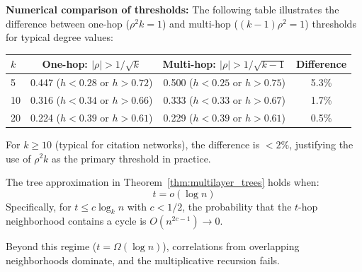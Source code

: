 \begin{remark}
\textbf{Numerical comparison of thresholds:} The following table illustrates the difference between one-hop ($\rho^2 k = 1$) and multi-hop ($(k-1)\rho^2 = 1$) thresholds for typical degree values:
\begin{center}
\begin{tabular}{lccc}
\toprule
$k$ & One-hop: $|\rho| > 1/\sqrt{k}$ & Multi-hop: $|\rho| > 1/\sqrt{k-1}$ & Difference \\
\midrule
5 & 0.447 ($h < 0.28$ or $h > 0.72$) & 0.500 ($h < 0.25$ or $h > 0.75$) & 5.3\% \\
10 & 0.316 ($h < 0.34$ or $h > 0.66$) & 0.333 ($h < 0.33$ or $h > 0.67$) & 1.7\% \\
20 & 0.224 ($h < 0.39$ or $h > 0.61$) & 0.229 ($h < 0.39$ or $h > 0.61$) & 0.5\% \\
\bottomrule
\end{tabular}
\end{center}
For $k \geq 10$ (typical for citation networks), the difference is $< 2\%$, justifying the use of $\rho^2 k$ as the primary threshold in practice.
\end{remark}

\begin{theorem}
\label{thm:validity_regime}
The tree approximation in Theorem~\ref{thm:multilayer_trees} holds when:
\begin{equation}
    t = o(\log n)
\end{equation}
Specifically, for $t \leq c \log_k n$ with $c < 1/2$, the probability that the $t$-hop neighborhood contains a cycle is $O(n^{2c-1}) \to 0$.

Beyond this regime ($t = \Omega(\log n)$), correlations from overlapping neighborhoods dominate, and the multiplicative recursion fails.
\end{theorem}

